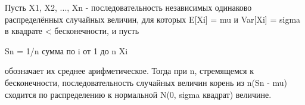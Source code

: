 \documentclass{article}
\begin{document}

Пусть X1, X2, ..., Xn - последовательность независимых
одинаково распределённых случайных величин, для которых
E[Xi] = mu и Var[Xi] = sigma в квадрате < бесконечности,
и пусть

Sn = 1/n сумма по i от 1 до n Xi

обозначает их среднее арифметическое. Тогда при n,
стремящемся к бесконечности, последовательность случайных
величин корень из n(Sn - mu) сходится по распределению
к нормальной N(0, sigma квадрат) величине.
\end{document}
